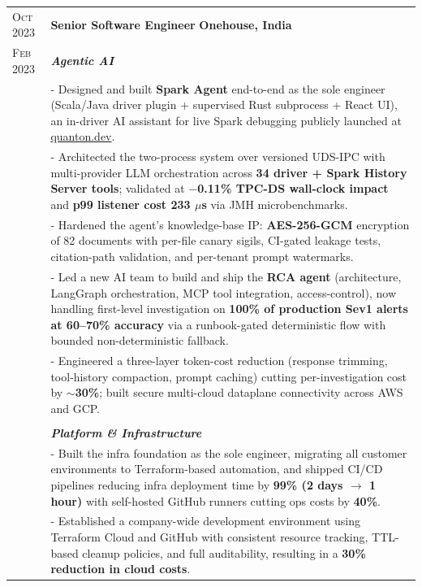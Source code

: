\documentclass[a4paper,10pt]{extarticle}
\begin{document}
\begin{tabularx}{\linewidth}{ l | X }
\textsc{Oct 2023} & \textbf{{Senior Software Engineer}} \hfill\textbf{Onehouse, India}\\
\textsc{Feb 2023} & \textcolor{subheadcolour}{\textit{\textbf{Agentic AI}}}\\[2pt]
& \small{- Designed and built \textbf{Spark Agent} end-to-end as the sole engineer (Scala/Java driver plugin + supervised Rust subprocess + React UI), an in-driver AI assistant for live Spark debugging publicly launched at \href{https://quanton.dev/\#ai}{quanton.dev}.}\\
& \small{- Architected the two-process system over versioned UDS-IPC with multi-provider LLM orchestration across \textbf{34 driver + Spark History Server tools}; validated at \textbf{$-$0.11\% TPC-DS wall-clock impact} and \textbf{p99 listener cost 233 $\mu$s} via JMH microbenchmarks.}\\
& \small{- Hardened the agent's knowledge-base IP: \textbf{AES-256-GCM} encryption of 82 documents with per-file canary sigils, CI-gated leakage tests, citation-path validation, and per-tenant prompt watermarks.}\\
& \small{- Led a new AI team to build and ship the \textbf{RCA agent} (architecture, LangGraph orchestration, MCP tool integration, access-control), now handling first-level investigation on \textbf{100\% of production Sev1 alerts at 60--70\% accuracy} via a runbook-gated deterministic flow with bounded non-deterministic fallback.}\\
& \small{- Engineered a three-layer token-cost reduction (response trimming, tool-history compaction, prompt caching) cutting per-investigation cost by \textbf{$\sim$30\%}; built secure multi-cloud dataplane connectivity across AWS and GCP.}\\
& \\[-2pt]
& \textcolor{subheadcolour}{\textit{\textbf{Platform \& Infrastructure}}}\\[2pt]
& \small{- Built the infra foundation as the sole engineer, migrating all customer environments to Terraform-based automation, and shipped CI/CD pipelines reducing infra deployment time by \textbf{99\% (2 days $\rightarrow$ 1 hour)} with self-hosted GitHub runners cutting ops costs by \textbf{40\%}.}\\
& \small{- Established a company-wide development environment using Terraform Cloud and GitHub with consistent resource tracking, TTL-based cleanup policies, and full auditability, resulting in a \textbf{30\% reduction in cloud costs}.}\\

\end{tabularx}
\end{document}

